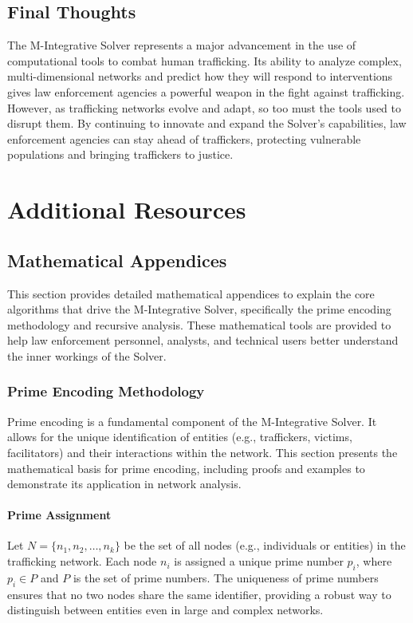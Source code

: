 \documentclass[%
 preprint, linenumbers,
 amsmath,amssymb,
 aps, physrev,
]{revtex4-2}
\begin{document}
\subsection{Final Thoughts}

The M-Integrative Solver represents a major advancement in the use of computational tools to combat human trafficking. Its ability to analyze complex, multi-dimensional networks and predict how they will respond to interventions gives law enforcement agencies a powerful weapon in the fight against trafficking. However, as trafficking networks evolve and adapt, so too must the tools used to disrupt them. By continuing to innovate and expand the Solver’s capabilities, law enforcement agencies can stay ahead of traffickers, protecting vulnerable populations and bringing traffickers to justice.

\section*{Additional Resources}

\subsection*{Mathematical Appendices}

This section provides detailed mathematical appendices to explain the core algorithms that drive the M-Integrative Solver, specifically the prime encoding methodology and recursive analysis. These mathematical tools are provided to help law enforcement personnel, analysts, and technical users better understand the inner workings of the Solver.

\subsubsection*{Prime Encoding Methodology}

Prime encoding is a fundamental component of the M-Integrative Solver. It allows for the unique identification of entities (e.g., traffickers, victims, facilitators) and their interactions within the network. This section presents the mathematical basis for prime encoding, including proofs and examples to demonstrate its application in network analysis.

\paragraph{Prime Assignment}
Let \( N = \{n_1, n_2, \dots, n_k\} \) be the set of all nodes (e.g., individuals or entities) in the trafficking network. Each node \( n_i \) is assigned a unique prime number \( p_i \), where \( p_i \in P \) and \( P \) is the set of prime numbers. The uniqueness of prime numbers ensures that no two nodes share the same identifier, providing a robust way to distinguish between entities even in large and complex networks.
\end{document}
